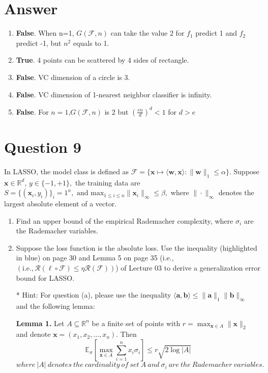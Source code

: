 \documentclass[
	12pt, %
]{fphw}
\begin{document}
\section*{Answer}
\begin{enumerate}
	\item \textbf{False}.  When n=1, $G(\mathcal{F},n)$ can take the value 2 for $f_1$ predict 1 and $f_2$ predict -1, but $n^2$ equals to 1.
	\item \textbf{True}. 4 points can be scattered by 4 sides of rectangle.
	\item \textbf{False}. VC dimension of a circle is 3.
	\item \textbf{False}. VC dimension of 1-nearest neighbor classifier is infinity.
	\item \textbf{False}. For $n=1$,$G(\mathcal{F},n)$ is 2 but $\left(\frac{en}d\right)^d<1$ for $d>e$
\end{enumerate}

\section*{Question 9}

\begin{problem}
In LASSO, the model class is defined as $\mathcal{F}=\{\mathbf{x}\mapsto\langle\mathbf{w},\mathbf{x}\rangle:\|\mathbf{w}\|_1\leq\alpha\}.$ Suppose $\mathbf{x}\in\mathbb{R}^d$, $y\in \{ - 1, + 1\} , $ the training data are $S= \{ ( \mathbf{x} _i, y_i) \} _i= 1^n, \text{ and max}_{1\leq i\leq n}\|\mathbf{x} _i\|_\infty\leq \beta, $ where $\|\cdot \|_\infty$ denotes the largest absolute element of a vector.
\medskip
\begin{enumerate}
\item Find an upper bound of the empirical Rademacher complexity, where $\sigma_i$ are the Rademacher variables. 
\item Suppose the loss function is the absolute loss. Use the inequality (highlighted in blue) on page
$30$ and Lemma 5 on page 35 (i.e., $(\mathrm{i.e.},\mathcal{R}(\ell\circ\mathcal{F})\leq\eta\mathcal{R}(\mathcal{F}))$) of Lecture 03 to derive a generalization error bound for LASSO.


  * Hint: For question (a), please use the inequality $\langle\mathbf{a},\mathbf{b}\rangle\leq\|\mathbf{a}\|_1\|\mathbf{b}\|_\infty$ and the following lemma:


  \textbf{Lemma 1.} Let \( A \subseteq \mathbb{R}^n \) be a finite set of points with \( r = \max_{\mathbf{x} \in A} \|\mathbf{x}\|_2 \) and denote \( \mathbf{x} = (x_1, x_2, \ldots, x_n) \). Then
  $$\mathbb{E}_{\sigma}\left[\max_{\mathbf{x}\in A}\sum_{i=1}^nx_i\sigma_i\right]\leq r\sqrt{2\log|A|}$$
$where\:|A|\:denotes\:the\:cardinality\:of\:set\:A\:and\:\sigma_i\:are\:the\:Rademacher\:variables.$
\end{enumerate}
\end{problem}
\end{document}
